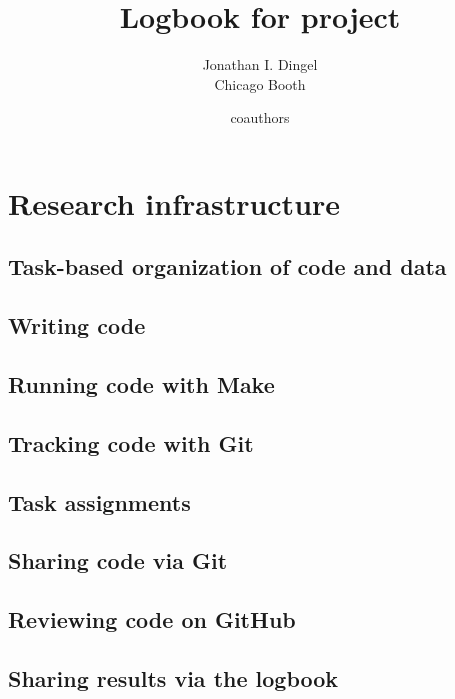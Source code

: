 \documentclass{report}
\title{Logbook for project}
\author{
Jonathan I. Dingel \\ {Chicago Booth} \and
coauthors
}
\date{}
\numberwithin{equation}{section}
\numberwithin{figure}{section}
\numberwithin{table}{section}
\begin{document}
\maketitle

\renewcommand{\thechapter}{\Alph{chapter}}
\setcounter{tocdepth}{1}
\tableofcontents
\etocsettocstyle{}{} %

\chapter{Research infrastructure}


\section{Task-based organization of code and data} 
\section{Writing code} 
\section{Running code with Make} 
\section{Tracking code with Git} 

\section{Task assignments} 
\section{Sharing code via Git} 
\section{Reviewing code on GitHub} 
\section{Sharing results via the logbook} 
\end{document}
